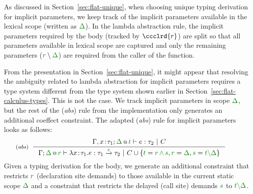 \begin{example}
As discussed in Section~\ref{sec:flat-unique}, when choosing unique typing derivation for
implicit parameters, we keep track of the implicit parameters available in the lexical scope
(written as $\cclrd{\Delta}$). In the lambda abstraction rule, the implicit parameters required by
the body (tracked by $\ccclrd{r}$) are split so that all parameters available in lexical scope
are captured and only the remaining parameters ($\cclrd{r}\setminus\cclrd{\Delta}$) are required
from the caller of the function.

From the presentation in Section~\ref{sec:flat-unique}, it might appear that resolving the ambiguity
related to lambda abstraction for implicit parameters requires a type system different from
the type system shown earlier in Section~\ref{sec:flat-calculus-types}. This is not the case.
We track implicit parameters in scope $\cclrd{\Delta}$, but the rest of the (\emph{abs}) rule from
the implementation only generates an additional coeffect constraint. The adapted (\emph{abs}) rule
for implicit parameters looks as follows:
%
\begin{equation*}
\hspace{-2em}
\tyrule{abs}
  {\coctx{\Gamma, x\!:\!\tau_1;\cclrd{\Delta}}{\cclrd{t}} \vdash e : \tau_2 ~|~ C}
  {\coctx{\Gamma;\cclrd{\Delta}}{\cclrd{r}} \vdash \lambda x\!:\!\tau_1.e : \tau_1 \xrightarrow{\cclrd{s}} \tau_2 ~|~
    C\cup\{\cclrd{t}=\cclrd{r} \,\czip\, \cclrd{s}, \cclrd{r}=\cclrd{\Delta}, \cclrd{s}=\cclrd{t}\cclrd{\setminus \Delta} \}}
\end{equation*}
%
Given a typing derivation for the body, we generate an additional constraint that restricts
$\cclrd{r}$ (declaration site demands) to those available in the current static scope
$\cclrd{\Delta}$ and a constraint that restricts the delayed (call site) demands
$\cclrd{s}$ to $\cclrd{t}\cclrd{\setminus \Delta}$.
\end{example}

